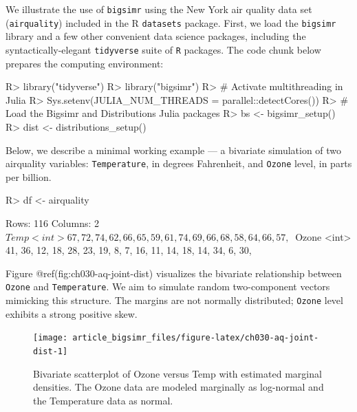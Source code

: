 \documentclass[
]{jss}
\begin{document}
We illustrate the use of \texttt{bigsimr} using the New York air quality
data set (\texttt{airquality}) included in the R \texttt{datasets}
package. First, we load the \texttt{bigsimr} library and a few other
convenient data science packages, including the syntactically-elegant
\texttt{tidyverse} suite of \texttt{R} packages. The code chunk below
prepares the computing environment:

\begin{CodeChunk}
\begin{CodeInput}
R> library("tidyverse")
R> library("bigsimr")
R> # Activate multithreading in Julia
R> Sys.setenv(JULIA_NUM_THREADS = parallel::detectCores())
R> # Load the Bigsimr and Distributions Julia packages
R> bs <- bigsimr_setup()
R> dist <- distributions_setup()
\end{CodeInput}
\end{CodeChunk}

Below, we describe a minimal working example --- a bivariate simulation
of two airquality variables: \texttt{Temperature}, in degrees
Fahrenheit, and \texttt{Ozone} level, in parts per billion.

\begin{CodeChunk}
\begin{CodeInput}
R> df <- airquality %
\end{CodeInput}
\end{CodeChunk}

\begin{CodeChunk}
\begin{CodeOutput}
Rows: 116
Columns: 2
$ Temp  <int> 67, 72, 74, 62, 66, 65, 59, 61, 74, 69, 66, 68, 58, 64, 66, 57, ~
$ Ozone <int> 41, 36, 12, 18, 28, 23, 19, 8, 7, 16, 11, 14, 18, 14, 34, 6, 30,~
\end{CodeOutput}
\end{CodeChunk}

Figure @ref(fig:ch030-aq-joint-dist) visualizes the bivariate
relationship between \texttt{Ozone} and \texttt{Temperature}. We aim to
simulate random two-component vectors mimicking this structure. The
margins are not normally distributed; \texttt{Ozone} level exhibits a
strong positive skew.

\begin{CodeChunk}
\begin{figure}

{\centering \texttt{[image: article\_bigsimr\_files/figure-latex/ch030-aq-joint-dist-1]} 

}

\caption[Bivariate scatterplot of Ozone versus Temp with estimated marginal densities]{Bivariate scatterplot of Ozone versus Temp with estimated marginal densities. The Ozone data are modeled marginally as log-normal and the Temperature data as normal.}\label{fig:ch030-aq-joint-dist}
\end{figure}
\end{CodeChunk}
\end{document}
